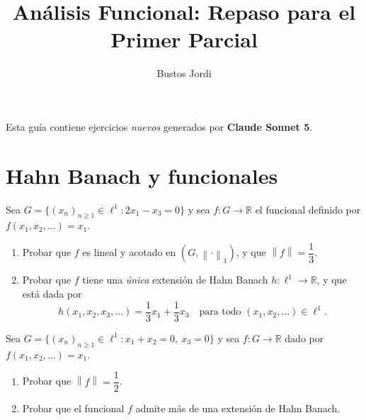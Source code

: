 \documentclass{article}
\theoremstyle{definition}
\newcommand{\R}{\mathbb{R}}
\newcommand{\norm}[1]{\left\lVert #1 \right\rVert}       %
\newenvironment{ejercicio}[1]{\begin{trivlist}
\item[\hskip \labelsep {\bfseries Ejercicio}\hskip \labelsep {\bfseries #1.}]}{\end{trivlist}}
\begin{document}
\title{Análisis Funcional: Repaso para el Primer Parcial}
\author{Bustos Jordi}
\date{}

\maketitle

\vspace{0.3cm}
\noindent
Esta guía contiene ejercicios \emph{nuevos} generados por \textbf{Claude Sonnet 5}.

\vspace{0.5cm}

\section{Hahn Banach y funcionales}

\begin{ejercicio}{1}
    Sea \( G = \{ {(x_n)}_{n \ge 1} \in \ell^1 : 2x_1 - x_3 = 0 \} \) y sea \( f : G \to \R \) el funcional definido por \( f(x_1, x_2, \dots) = x_1 \).
    \begin{enumerate}
        \item Probar que \( f \) es lineal y acotado en \( (G, \norm{\cdot}_1) \), y que \( \norm{f} = \dfrac{1}{3} \).
        \item Probar que \( f \) tiene una \emph{única} extensión de Hahn Banach \( h : \ell^1 \to \R \), y que está dada por
              \[
                  h(x_1, x_2, x_3, \dots) = \frac{1}{3} x_1 + \frac{1}{3} x_3 \quad \text{para todo } (x_1,x_2,\dots) \in \ell^1.
              \]
    \end{enumerate}
\end{ejercicio}

\vspace{0.3cm}

\begin{ejercicio}{2}
    Sea \( G = \{ {(x_n)}_{n \ge 1} \in \ell^1 : x_1 + x_2 = 0,\ x_3 = 0 \} \) y sea \( f : G \to \R \) dado por \( f(x_1, x_2, \dots) = x_1 \).
    \begin{enumerate}
        \item Probar que \( \norm{f} = \dfrac{1}{2} \).
        \item Probar que el funcional \( f \) admite más de una extensión de Hahn Banach.
    \end{enumerate}
\end{ejercicio}

\vspace{0.3cm}
\end{document}
